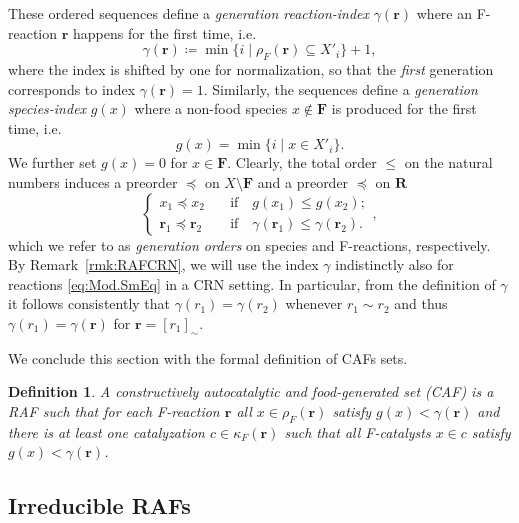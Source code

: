 \documentclass[pdflatex]{sn-jnl}
\theoremstyle{thmstyleone}%
\theoremstyle{examplesty}%
\theoremstyle{thmstylethree}%
\newtheorem{definition}[theorem]{Definition}%
\newcommand{\food}{\ensuremath{\mathbf{F}}}
\newcommand{\fr}[0]{\mathbf{r}}
\newcommand{\cat}{\kappa_F}
\newcommand{\sgen}{g}
\newcommand{\rgen}{\gamma}
\newcommand{\feducts}{\rho_F}
\begin{document}
These ordered sequences define a \emph{generation reaction-index}
$\gamma(\mathbf{r})$ where an F-reaction $\mathbf{r}$ happens for the first
time, i.e.
\begin{equation}\label{def:genreactionindex}
  \gamma(\mathbf{r})\coloneqq \min\{i \; | \; \feducts(\mathbf{r})\subseteq X'_i\} + 1,
\end{equation} 
where the index is shifted by one for normalization, so that the
\emph{first} generation corresponds to index $\gamma(\mathbf{r})=1$.
Similarly, the sequences define a \emph{generation species-index} $g(x)$
where a non-food species $x\not\in \food$ is produced for the first time,
i.e. \begin{equation} g(x)= \min \{i \; | \; x\in
X'_i\}.\end{equation} We further set $g(x)=0$ for $x\in\food$. Clearly, the 
total order $\le$ on the natural numbers induces a preorder $\preccurlyeq$ 
on $X\setminus \food$ and a preorder $\preceq$ on $\mathbf{R}$
\begin{equation}
\begin{cases}
  x_1\preccurlyeq x_2 \quad&\text{if}\quad \sgen(x_1) \leq \sgen(x_2);\\
  \fr_1\preceq \fr_2 \quad &\text{if} \quad \rgen(\fr_1) \leq \rgen(\fr_2).
\end{cases},
\end{equation}
which we refer to as \emph{generation orders} on species and F-reactions,
respectively. By Remark~\ref{rmk:RAFCRN}, we will use the index $\gamma$
indistinctly also for reactions \eqref{eq:Mod.SmEq} in a CRN setting. In
particular, from the definition of $\gamma$ it follows consistently that
$\gamma(r_1)=\gamma(r_2)$ whenever $r_1\sim r_2$ and thus
$\gamma(r_1)=\gamma(\fr)$ for $\fr=[r_1]_\sim$.

We conclude this section with the formal definition of CAFs sets.
\vspace{6pt}
\begin{definition}\label{def:CAF}
  A \emph{constructively autocatalytic and food-generated} set (CAF) is a
  RAF such that for each F-reaction $\fr$ all $x\in \feducts(\fr)$ satisfy
  $\sgen(x)<\rgen(\fr)$ and there is at least one catalyzation
  $c\in \cat(\mathbf{r})$ such that all F-catalysts $x\in c$ satisfy
  $\sgen(x)< \rgen(\fr)$.
\end{definition}

\subsection{Irreducible RAFs}\label{sec:IrrRAF}
\end{document}
